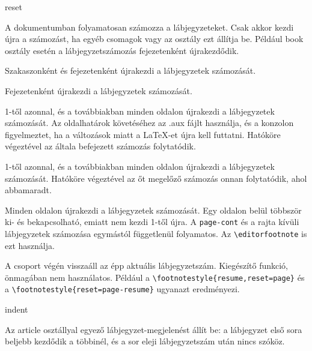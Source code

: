 \documentclass[12pt]{article}
\begin{document}
\begin{description}

\begin{footstyle}{reset}

\item[none]
A dokumentumban folyamatosan számozza a lábjegyzeteket.
Csak akkor kezdi újra a számozást, ha egyéb csomagok vagy az osztály ezt állítja be.
Például \textsf{book} osztály esetén a lábjegyzetszámozás fejezetenként újrakezdődik.

\item[section]
Szakaszonként és fejezetenként újrakezdi a lábjegyzetek számozását.

\item[chapter]
Fejezetenként újrakezdi a lábjegyzetek számozását.

\item[page]
1-től azonnal, és a továbbiakban minden oldalon újrakezdi a lábjegyzetek számozását.
Az oldalhatárok követéséhez az \textsf{.aux} fájlt használja, és a konzolon figyelmeztet, ha a változások miatt a \LaTeX-et újra kell futtatni.
Hatóköre végeztével az általa befejezett számozás folytatódik.

\item[page-resume]
1-től azonnal, és a továbbiakban minden oldalon újrakezdi a lábjegyzetek számozását.
Hatóköre végeztével az őt megelőző számozás onnan folytatódik, ahol abbamaradt.

\item[page-cont]
Minden oldalon újrakezdi a lábjegyzetek számozását.
Egy oldalon belül többször ki- és bekapcsolható, emiatt nem kezdi 1-től újra.
A \texttt{page-cont} és a rajta kívüli lábjegyzetek számozása egymástól függetlenül folyamatos.
Az \verb|\editorfootnote| is ezt használja.

\end{footstyle}

\item[resume]
A csoport végén visszaáll az épp aktuális lábjegyzetszám. 
Kiegészítő funkció, önmagában nem használatos.
Például a \verb|\footnotestyle{resume,reset=page}| és a \verb|\footnotestyle{reset=page-resume}| ugyanazt eredményezi.

\begin{footstyle}{indent}

\item[article-nosp]
Az \textsf{article} osztállyal egyező lábjegyzet-megjelenést állít be: a lábjegyzet első sora beljebb kezdődik a többinél, és a sor eleji lábjegyzetszám után nincs szóköz.


\end{footstyle}
\end{description}
\end{document}
